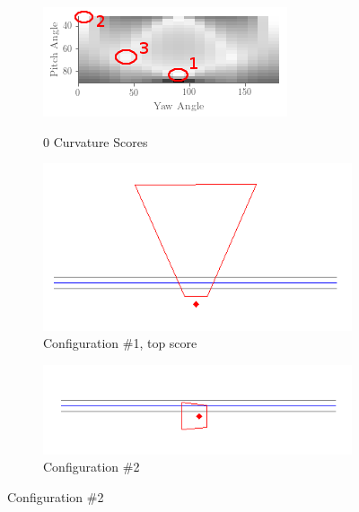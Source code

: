 \documentclass[a4paper,12pt,twoside,openright]{report}
\begin{document}
\begin{figure}[h!]
    \begin{subfigure}[b]{0.45\textwidth}
    \centering
    \includegraphics[width=\textwidth]{figures/simple_objective/pitch_yaw_0_curvature_annotated.png}
    \label{fig:simpleobjective:0curvature}
    \caption{0 Curvature Scores}
\end{subfigure}
\begin{subfigure}[b]{0.45\textwidth}
    \centering
    \includegraphics[width=\textwidth]{figures/simple_objective/0_curvature_bestpos_small.png}
    \caption{Configuration \#1, top score}
\end{subfigure}
\begin{subfigure}[b]{0.49\textwidth}
    \centering
    \includegraphics[width=\textwidth]{figures/simple_objective/0_curvature_pos2_small.png}
    \caption{Configuration \#2}
\end{subfigure}

\end{figure}
\end{document}
